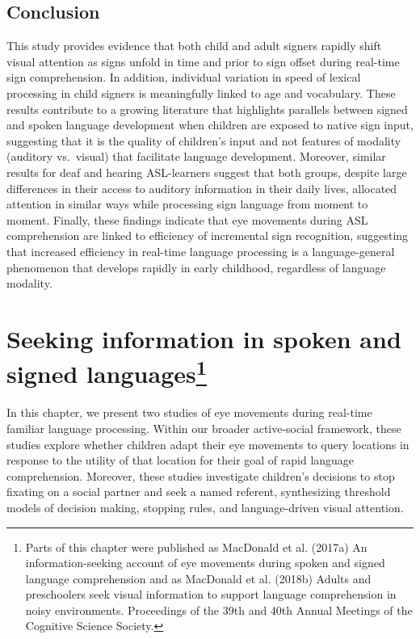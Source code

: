 \documentclass[oneside]{report}
\begin{document}
\section{Conclusion}\label{conclusion}

This study provides evidence that both child and adult signers rapidly
shift visual attention as signs unfold in time and prior to sign offset
during real-time sign comprehension. In addition, individual variation
in speed of lexical processing in child signers is meaningfully linked
to age and vocabulary. These results contribute to a growing literature
that highlights parallels between signed and spoken language development
when children are exposed to native sign input, suggesting that it is
the quality of children's input and not features of modality (auditory
vs.~visual) that facilitate language development. Moreover, similar
results for deaf and hearing ASL-learners suggest that both groups,
despite large differences in their access to auditory information in
their daily lives, allocated attention in similar ways while processing
sign language from moment to moment. Finally, these findings indicate
that eye movements during ASL comprehension are linked to efficiency of
incremental sign recognition, suggesting that increased efficiency in
real-time language processing is a language-general phenomenon that
develops rapidly in early childhood, regardless of language modality.

\chapter[Seeking information in spoken and signed
languages]{\texorpdfstring{Seeking information in spoken and signed
languages\footnote{Parts of this chapter were published as MacDonald et
  al. (2017a) An information-seeking account of eye movements during
  spoken and signed language comprehension and as MacDonald et al.
  (2018b) Adults and preschoolers seek visual information to support
  language comprehension in noisy environments. Proceedings of the 39th
  and 40th Annual Meetings of the Cognitive Science Society.}}{Seeking information in spoken and signed languages}}\label{seeking-information-in-spoken-and-signed-languages}

In this chapter, we present two studies of eye movements during
real-time familiar language processing. Within our broader active-social
framework, these studies explore whether children adapt their eye
movements to query locations in response to the utility of that location
for their goal of rapid language comprehension. Moreover, these studies
investigate children's decisions to stop fixating on a social partner
and seek a named referent, synthesizing threshold models of decision
making, stopping rules, and language-driven visual attention.
\end{document}
